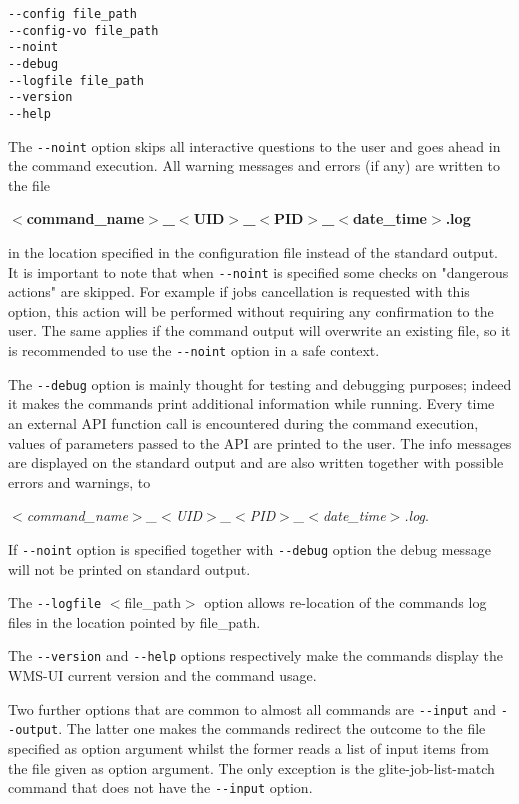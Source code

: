 {\begin{verbatim}
--config file_path
--config-vo file_path
--noint
--debug
--logfile file_path
--version
--help
\end{verbatim} 

The \verb!--noint! option skips all interactive questions to the user and goes ahead in the command execution. 
All warning messages and errors (if any) are written to the file 

\textbf{$<$command\_name$>$\-\_$<$UID$>$\-\_$<$PID$>$\-\_$<$date\_time$>$.log} 

in the location specified in the configuration file instead of the standard output. 
It is important to note that when \verb!--noint! is specified some checks on "dangerous actions" are skipped. 
For example if jobs cancellation is requested with this option, this action will be performed without requiring 
any confirmation to the user. The same applies if the command output will overwrite an existing file, so it is 
recommended to use the \verb!--noint! option in a safe context.

\medskip

The \verb!--debug! option is mainly thought for testing and debugging purposes; indeed it makes the commands 
print additional information while running. Every time an external API function call is encountered during the 
command execution, values of parameters passed to the API are printed to the user. The info messages are displayed 
on the standard output and are also written together with possible errors and warnings, to 

\textit{$<$command\_name$>$\-\_$<$UID$>$\-\_$<$PID$>$\-\_$<$date\-\_time$>$.log}.

\medskip

If \verb!--noint! option is specified together with \verb!--debug! option the debug message will not be printed on 
standard output.

\medskip

The \verb!--logfile! $<$file\_path$>$ option allows re-location of the commands log files in the location pointed 
by file\_path.

\medskip

The \verb!--version! and \verb!--help! options respectively make the commands display the WMS-UI current version and 
the command usage.

\medskip

Two further options that are common to almost all commands are \verb!--input! and \verb!--output!. The latter one 
makes the commands redirect the outcome to the file specified as option argument whilst the former reads a list of 
input items from the file given as option argument. The only exception is the glite\--job\--list\--match command 
that does not have the \verb!--input! option.

}
